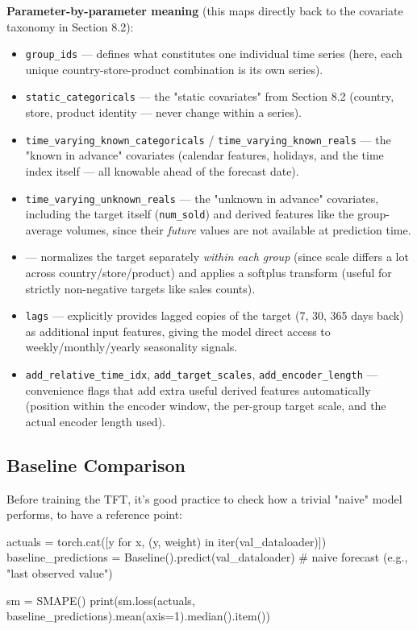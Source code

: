 \documentclass[12pt,openany]{book}
\theoremstyle{definition}
\theoremstyle{remark}
\begin{document}
\textbf{Parameter-by-parameter meaning} (this maps directly back to the covariate taxonomy in Section 8.2):
\begin{itemize}
\item \texttt{group\_ids} --- defines what constitutes one individual time series (here, each unique country-store-product combination is its own series).
\item \texttt{static\_categoricals} --- the "static covariates" from Section 8.2 (country, store, product identity --- never change within a series).
\item \texttt{time\_varying\_known\_categoricals} / \texttt{time\_varying\_known\_reals} --- the "known in advance" covariates (calendar features, holidays, and the time index itself --- all knowable ahead of the forecast date).
\item \texttt{time\_varying\_unknown\_reals} --- the "unknown in advance" covariates, including the target itself (\texttt{num\_sold}) and derived features like the group-average volumes, since their \emph{future} values are not available at prediction time.
\item {} --- normalizes the target separately \emph{within each group} (since scale differs a lot across country/store/product) and applies a softplus transform (useful for strictly non-negative targets like sales counts).
\item \texttt{lags} --- explicitly provides lagged copies of the target (7, 30, 365 days back) as additional input features, giving the model direct access to weekly/monthly/yearly seasonality signals.
\item \texttt{add\_relative\_time\_idx}, \texttt{add\_target\_scales}, \texttt{add\_encoder\_length} --- convenience flags that add extra useful derived features automatically (position within the encoder window, the per-group target scale, and the actual encoder length used).

\end{itemize}

\subsection{Baseline Comparison}

Before training the TFT, it's good practice to check how a trivial "naive" model performs, to have a reference point:

\begin{python}
actuals = torch.cat([y for x, (y, weight) in iter(val_dataloader)])
baseline_predictions = Baseline().predict(val_dataloader)   # naive forecast (e.g., "last observed value")

sm = SMAPE()
print(sm.loss(actuals, baseline_predictions).mean(axis=1).median().item())
\end{python}
\end{document}
